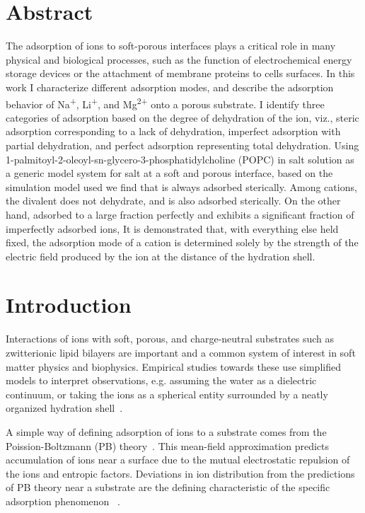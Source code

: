     \section{Abstract}
    The adsorption of ions to soft-porous interfaces plays a critical role in 
    many physical and biological processes, such as the function of electrochemical 
    energy storage devices or 
    the attachment of membrane proteins to cells surfaces. 
    In this work I characterize different adsorption modes, and
    describe the adsorption behavior of Na\textsuperscript{+}, Li\textsuperscript{+}, and Mg\textsuperscript{2+} 
    {onto a porous substrate}.
    I identify three categories of adsorption based on 
    the degree of dehydration of the ion, 
    viz., steric adsorption {corresponding to a lack of dehydration}, 
    imperfect adsorption {with partial dehydration}, and 
    perfect adsorption {representing total dehydration}.
    Using 1-palmitoyl-2-oleoyl-sn-glycero-3-phosphatidylcholine (POPC) 
    in salt solution as a generic model system for salt at a soft and 
    porous interface, based on the simulation model used we find that 
    \cl{} is always adsorbed sterically. Among cations, the divalent
    \mg{} does not dehydrate, and is {also} adsorbed sterically. 
    On the other hand, \na{}  
    adsorbed to a large fraction perfectly 
    {and \li{} exhibits a significant fraction of imperfectly adsorbed ions,}
    It is demonstrated that, with everything else held fixed, the 
    adsorption mode of a cation is determined
    solely by the strength of the electric field produced by the 
    ion at the distance of the hydration shell. 


\section{Introduction}
Interactions of ions with soft, porous, and charge-neutral substrates
such as zwitterionic lipid bilayers are important and a common
system of interest in soft matter physics and biophysics.
Empirical studies towards these use simplified
models to interpret observations, e.g. assuming the water as a
dielectric continuum,
or taking the ions as a spherical entity surrounded
by a neatly organized hydration shell~\cite{israelachvili:2011:intermol}.

A simple way of defining adsorption of ions to a substrate 
comes from the Poission-Boltzmann (PB) theory~\cite{israelachvili:2011:intermol}.
{This mean-field approximation predicts accumulation
of ions near a surface due to the mutual electrostatic repulsion
of the ions and entropic factors.}
{Deviations in ion distribution from the predictions of PB theory near a substrate are
    the defining characteristic of the specific adsorption phenomenon
~\cite{stern:1924:theory,grahame:1947:electrical}.}


